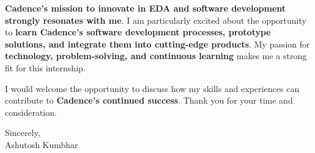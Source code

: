 \documentclass[11pt]{article}
\begin{document}
\textbf{Cadence’s mission to innovate in EDA and software development strongly resonates with me}. I am particularly excited about the opportunity to \textbf{learn Cadence’s software development processes, prototype solutions, and integrate them into cutting-edge products}. My passion for \textbf{technology, problem-solving, and continuous learning} makes me a strong fit for this internship.

I would welcome the opportunity to discuss how my skills and experiences can contribute to \textbf{Cadence’s continued success}. Thank you for your time and consideration.

Sincerely, \\
Ashutosh Kumbhar
\end{document}
